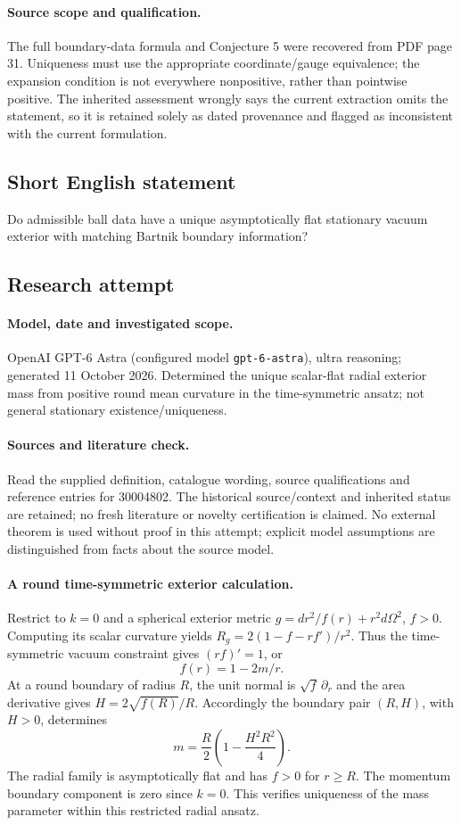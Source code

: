 \documentclass[11pt]{article}
\begin{document}
\paragraph{Source scope and qualification.}
The full boundary-data formula and Conjecture 5 were recovered from PDF page 31. Uniqueness must use the appropriate coordinate/gauge equivalence; the expansion condition is not everywhere nonpositive, rather than pointwise positive. The inherited assessment wrongly says the current extraction omits the statement, so it is retained solely as dated provenance and flagged as inconsistent with the current formulation.
\subsection{Short English statement}
Do admissible ball data have a unique asymptotically flat stationary vacuum exterior with matching Bartnik boundary information?
\subsection{Research attempt}
\paragraph{Model, date and investigated scope.}
OpenAI GPT-6 Astra (configured model \texttt{gpt-6-astra}), ultra reasoning; generated 11 October 2026. Determined the unique scalar-flat radial exterior mass from positive round mean curvature in the time-symmetric ansatz; not general stationary existence/uniqueness.

\paragraph{Sources and literature check.}
Read the supplied definition, catalogue wording, source qualifications and reference entries for 30004802. The historical source/context and inherited status are retained; no fresh literature or novelty certification is claimed. No external theorem is used without proof in this attempt; explicit model assumptions are distinguished from facts about the source model.

\paragraph{A round time-symmetric exterior calculation.} Restrict to \(k=0\) and a spherical exterior metric \(g=dr^2/f(r)+r^2d\Omega^2\), \(f>0\). Computing its scalar curvature yields \(R_g=2(1-f-rf')/r^2\). Thus the time-symmetric vacuum constraint gives \((rf)'=1\), or
\[
 f(r)=1-2m/r.
\]
At a round boundary of radius \(R\), the unit normal is \(\sqrt f\,\partial_r\) and the area derivative gives \(H=2\sqrt{f(R)}/R\). Accordingly the boundary pair \((R,H)\), with \(H>0\), determines
\[
 m=\frac R2\left(1-\frac{H^2R^2}{4}\right).
\]
The radial family is asymptotically flat and has \(f>0\) for \(r\ge R\). The momentum boundary component is zero since \(k=0\). This verifies uniqueness of the mass parameter within this restricted radial ansatz.
\end{document}
